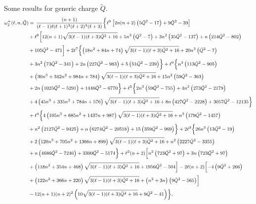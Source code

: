 \documentclass[11pt]{article}
\numberwithin{equation}{section}
\begin{document}
Some results for generic charge $\tilde{Q}$.
\begin{equation}\footnotesize
\begin{aligned}
\omega_2^+(\ell,n,\tilde{Q})&=\,\frac{(n+1)}{(\ell-1) \ell (\ell+1)^3 (\ell+2)^3 (\ell+3)} \biggl\{\ell^9 \left[2 n (n+2) \left(5 \tilde{Q}^2-17\right)+9 \tilde{Q}^2-39\right]\\
&+\ell^8 \biggl[12 (n+1) \sqrt{3 (\ell-1) (\ell+3) \tilde{Q}^2+16}+5 n^3 \left(\tilde{Q}^2-7\right)+3 n^2 \left(35 \tilde{Q}^2-137\right)+n \left(214 \tilde{Q}^2-802\right)\\
&+105 \tilde{Q}^2-471\biggr]+2 \ell^7 \biggl\{\left(18 n^2+84 n+74\right) \sqrt{3 (\ell-1) (\ell+3) \tilde{Q}^2+16}+20 n^3 \left(\tilde{Q}^2-7\right)\\
&+3 n^2 \left(73 \tilde{Q}^2-341\right)+2 n \left(227 \tilde{Q}^2-983\right)+5 \left(51 \tilde{Q}^2-239\right)\biggr\}+\ell^6 \biggl\{n^3 \left(113 \tilde{Q}^2-905\right)\\
&+\left(30 n^3+342 n^2+984 n+784\right) \sqrt{3 (\ell-1) (\ell+3) \tilde{Q}^2+16}+15 n^2 \left(59 \tilde{Q}^2-363\right)\\
&+2 n \left(1025 \tilde{Q}^2-5291\right)+1446 \tilde{Q}^2-6770\biggr\}+\ell^5 \biggl\{2 n^3 \left(59 \tilde{Q}^2-755\right)+4 n^2 \left(273 \tilde{Q}^2-2179\right)\\
&+4 \left(45 n^3+335 n^2+784 n+576\right) \sqrt{3 (\ell-1) (\ell+3) \tilde{Q}^2+16}+8 n \left(427 \tilde{Q}^2-2228\right)+3057 \tilde{Q}^2-12135\biggr\}\\
&+\ell^4 \biggl\{4 \left(105 n^3+685 n^2+1437 n+987\right) \sqrt{3 (\ell-1) (\ell+3) \tilde{Q}^2+16}+n^3 \left(179 \tilde{Q}^2-1457\right)\\
&+n^2 \left(2127 \tilde{Q}^2-9425\right)+n \left(6274 \tilde{Q}^2-20518\right)+15 \left(359 \tilde{Q}^2-969\right)\biggr\}+2 \ell^3 \biggl\{26 n^3 \left(13 \tilde{Q}^2-19\right)\\
&+2 \left(120 n^3+705 n^2+1366 n+899\right) \sqrt{3 (\ell-1) (\ell+3) \tilde{Q}^2+16}+n^2 \left(2227 \tilde{Q}^2-3355\right)\\
&+n \left(4686 \tilde{Q}^2-7246\right)+3300 \tilde{Q}^2-5174\biggr\}+\ell^2 (n+2) \biggl[n^2 \left(723 \tilde{Q}^2+97\right)+3 n \left(723 \tilde{Q}^2+97\right)\\
&+\left(118 n^2+354 n+468\right) \sqrt{3 (\ell-1) (\ell+3) \tilde{Q}^2+16}+1956 \tilde{Q}^2-504\biggr]-2\ell (n+2) \biggl[-4 \left(9 \tilde{Q}^2+266\right)\\
&+\left(122 n^2+366 n+220\right) \sqrt{3 (\ell-1) (\ell+3) \tilde{Q}^2+16}+\left(n^2+3 n\right) \left(9 \tilde{Q}^2-565\right)\biggr]\\
&-12 (n+1) (n+2)^2 \left(10 \sqrt{3 (\ell-1) (\ell+3) \tilde{Q}^2+16}+9 \tilde{Q}^2-41\right)\biggr\},
\end{aligned}
\end{equation}
\end{document}
